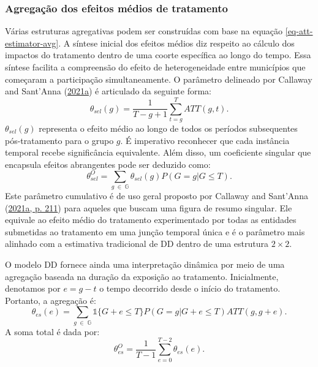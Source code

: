 \documentclass[12pt, a4paper, twoside]{article}
\numberwithin{equation}{subsection} %
\begin{document}
\hypertarget{sec-aggregating}{%
\subsubsection{Agregação dos efeitos médios de
tratamento}\label{sec-aggregating}}

Várias estruturas agregativas podem ser construídas com base na equação
\eqref{eq-att-estimator-avg}. A síntese inicial dos efeitos médios diz
respeito ao cálculo dos impactos do tratamento dentro de uma coorte
específica ao longo do tempo. Essa síntese facilita a compreensão do
efeito de heterogeneidade entre municípios que começaram a participação
simultaneamente. O parâmetro delineado por Callaway and Sant'Anna
(\protect\hyperlink{ref-CALLAWAY2021200}{2021a}) é articulado da
seguinte forma: \begin{equation} \label{eq-group-aggte}
\theta_{sel}(g) = \frac{1}{T - g + 1} \sum_{t=g}^{T} ATT(g, t).
\end{equation} \(\theta_{sel}(g)\) representa o efeito médio ao longo de
todos os períodos subsequentes pós-tratamento para o grupo \(g\). É
imperativo reconhecer que cada instância temporal recebe significância
equivalente. Além disso, um coeficiente singular que encapsula efeitos
abrangentes pode ser deduzido como:
\begin{equation} \label{eq-group-aggte-overall}
\theta_{sel}^O = \sum_{g \; \in \; \mathbb{G}} \theta_{sel}(g) P(G = g|G \leq T).
\end{equation} Este parâmetro cumulativo é de uso geral proposto por
Callaway and Sant'Anna (\protect\hyperlink{ref-CALLAWAY2021200}{2021a,
p. 211}) para aqueles que buscam uma figura de resumo singular. Ele
equivale ao efeito médio do tratamento experimentado por todas as
entidades submetidas ao tratamento em uma junção temporal única e é o
parâmetro mais alinhado com a estimativa tradicional de DD dentro de uma
estrutura \(2 \times 2\).

O modelo DD fornece ainda uma interpretação dinâmica por meio de uma
agregação baseada na duração da exposição ao tratamento. Inicialmente,
denotamos por \(e = g - t\) o tempo decorrido desde o início do
tratamento. Portanto, a agregação é:
\begin{equation} \label{eq-dyn-time-aggte}
\theta_{es}(e) = \sum_{g \; \in \; \mathbb{G}} \mathds{1}\{G + e \leq T\} P(G = g|G + e \leq T) ATT(g, g + e).
\end{equation} A soma total é dada por:
\begin{equation} \label{eq-dyn-overall}
\theta_{es}^O = \frac{1}{T-1} \sum_{e = 0}^{T-2} \theta_{es}(e).
\end{equation}
\end{document}
